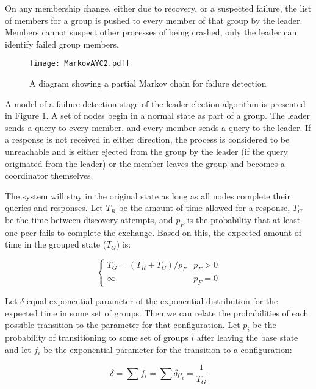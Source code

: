 On any membership change, either due to recovery, or a suspected failure, the
list of members for a group is pushed to every member of that group by the
leader. Members cannot suspect other processes of being crashed, only the
leader can identify failed group members.

\begin{figure}
\centering
\texttt{[image: MarkovAYC2.pdf]}
\caption{A diagram showing a partial Markov chain for failure detection}
\label{fig:MARKOVAYC}
\end{figure}

A model of a failure detection stage of the leader election algorithm is presented in
Figure \ref{fig:MARKOVAYC}. A set of nodes begin in a normal state as part of a group.
The leader sends a query to every member, and every member sends a query to the leader.
If a response is not received in either direction, the process is considered to be
unreachable and is either ejected from the group by the leader (if the query originated from the leader)
or the member leaves the group and becomes a coordinator themselves.

The system will stay in the original state as long as all nodes complete their queries and responses.
Let $T_{R}$ be the amount of time allowed for a response, $T_{C}$ be the time between
discovery attempts, and $p_{F}$ is the probability that at least one peer fails to complete the exchange.
Based on this, the expected amount of time in the grouped state ($T_{G}$) is:

\begin{equation}
\begin{cases}
T_{G} = ( T_{R}+T_{C}  ) / p_{F} & p_{F} > 0 \\
\infty & p_{F} = 0
\end{cases}
\end{equation}

Let $\delta$ equal exponential parameter of the exponential distribution for the expected time in some
set of groups. Then
we can relate the probabilities of each possible transition to the parameter for that configuration. Let
$p_{i}$ be the probability of transitioning to some set of groups $i$ after leaving the base state and let
$f_{i}$ be the exponential parameter for the transition to a configuration:

\begin{equation}
\delta = \sum f_{i} = \sum \delta p_{i} = \frac{1}{T_{G}}
\end{equation}


